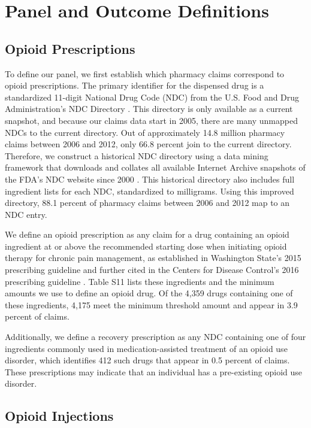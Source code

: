 \documentclass[9pt,twoside]{pnas-new}
\begin{document}
\section{Panel and Outcome Definitions}

\subsection{Opioid Prescriptions}

To define our panel, we first establish which pharmacy claims correspond to opioid prescriptions. The primary identifier for the dispensed drug is a standardized 11-digit National Drug Code (NDC) from the U.S. Food and Drug Administration's NDC Directory \cite{ndc}. This directory is only available as a current snapshot, and because our claims data start in 2005, there are many unmapped NDCs to the current directory. Out of approximately 14.8 million pharmacy claims between 2006 and 2012, only 66.8 percent join to the current directory. Therefore, we construct a historical NDC directory using a data mining framework that downloads and collates all available Internet Archive snapshots of the FDA's NDC website since 2000 \cite{historicalndc}. This historical directory also includes full ingredient lists for each NDC, standardized to milligrams. Using this improved directory, 88.1 percent of pharmacy claims between 2006 and 2012 map to an NDC entry. 

We define an opioid prescription as any claim for a drug containing an opioid ingredient at or above the recommended starting dose when initiating opioid therapy for chronic pain management, as established in Washington State's 2015 prescribing guideline and further cited in the Centers for Disease Control's 2016 prescribing guideline \cite{amdg, dowell}. Table S11 lists these ingredients and the minimum amounts we use to define an opioid drug. Of the 4,359 drugs containing one of these ingredients, 4,175 meet the minimum threshold amount and appear in 3.9 percent of claims.

Additionally, we define a recovery prescription as any NDC containing one of four ingredients commonly used in medication-assisted treatment of an opioid use disorder, which identifies 412 such drugs that appear in 0.5 percent of claims. These prescriptions may indicate that an individual has a pre-existing opioid use disorder.

\subsection{Opioid Injections}
\end{document}
